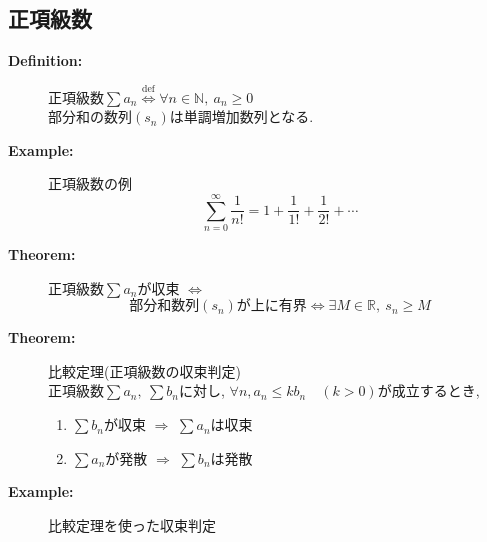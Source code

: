 \documentclass[dvipdfmx]{jsarticle}
\begin{document}
    \subsection{正項級数}
    \begin{description}
        \item[\bf{Definition:}] 正項級数$\sum a_n \overset{\mathrm{def}}{\Leftrightarrow} \forall n \in \mathbb{N},\ a_n \geq 0 $ \\
            部分和の数列$(s_n)$は単調増加数列となる.

        \item[\bf{Example:}] 正項級数の例 \\
            $$ \sum_{n=0}^{\infty} \frac{1}{n!} = 1 + \frac{1}{1!} + \frac{1}{2!} + \cdots $$ 

        \item[\bf{Theorem:}] 正項級数$\sum a_n$が収束 $\Leftrightarrow$
            $$ \text{部分和数列} (s_n) \text{が上に有界} \Leftrightarrow \exists M \in \mathbb{R},\ s_n \geq M$$
        
        \item[\bf{Theorem:}] 比較定理(正項級数の収束判定) \\
            正項級数$\sum a_n,\ \sum b_n$に対し, $\forall n, a_n \leq k b_n \quad (k > 0)$が成立するとき, 
            \begin{enumerate}
                \item $\sum b_n$が収束 $\Rightarrow$ $\sum a_n$は収束
                \item $\sum a_n$が発散 $\Rightarrow$ $\sum b_n$は発散
            \end{enumerate}
        
        \item[\bf{Example:}] 比較定理を使った収束判定
            
    \end{description}
\end{document}
